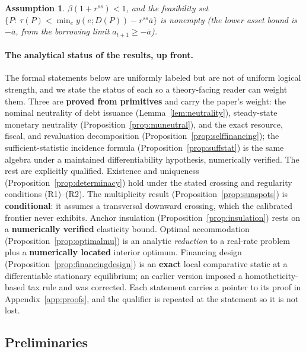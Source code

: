 \documentclass[12pt]{article}
\newtheorem{assumption}{Assumption}
\begin{document}
\begin{assumption}\label{ass:feasible}
$\beta(1+r^{ss})<1$, and the feasibility set
$\{P:\ \tau(P) < \min_e y(e;D(P)) - r^{ss}\bar a\}$ is nonempty (the lower
asset bound is $-\bar a$, from the borrowing limit $a_{t+1}\ge-\bar a$).
\end{assumption}

\paragraph{The analytical status of the results, up front.} The formal
statements below are uniformly labeled but are not of uniform logical
strength, and we state the status of each so a theory-facing reader can weight
them. Three are \textbf{proved from primitives} and carry the paper's weight:
the nominal neutrality of debt issuance (Lemma~\ref{lem:neutrality}),
steady-state monetary neutrality (Proposition~\ref{prop:muneutral}), and the
exact resource, fiscal, and revaluation decomposition (Proposition~\ref{prop:selffinancing});
the sufficient-statistic incidence formula
(Proposition~\ref{prop:suffstat}) is the same algebra under a maintained
differentiability hypothesis, numerically verified. The
rest are explicitly qualified. Existence and uniqueness
(Proposition~\ref{prop:determinacy}) hold under the stated crossing and
regularity conditions (R1)--(R2). The multiplicity result
(Proposition~\ref{prop:sunspots}) is \textbf{conditional}: it assumes a
transversal downward crossing, which the calibrated frontier never exhibits.
Anchor insulation (Proposition~\ref{prop:insulation}) rests on a
\textbf{numerically verified} elasticity bound. Optimal accommodation
(Proposition~\ref{prop:optimalmu}) is an analytic \emph{reduction} to a
real-rate problem plus a \textbf{numerically located} interior optimum.
Financing design (Proposition~\ref{prop:financingdesign}) is an
\textbf{exact} local comparative static at a differentiable stationary
equilibrium; an earlier version imposed a homotheticity-based tax rule and
was corrected. Each
statement carries a pointer to its proof in Appendix~\ref{app:proofs}, and the
qualifier is repeated at the statement so it is not lost.

\subsection{Preliminaries}
\end{document}
